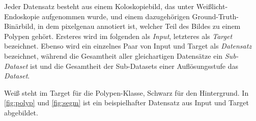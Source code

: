 Jeder Datensatz besteht aus einem Koloskopiebild, das unter Weißlicht-Endoskopie aufgenommen wurde, und einem dazugehörigen Ground-Truth-Binärbild, in dem pixelgenau annotiert ist, welcher Teil des Bildes zu einem Polypen gehört.
Ersteres wird im folgenden als \emph{Input}, letzteres als \emph{Target} bezeichnet.
Ebenso wird ein einzelnes Paar von Input und Target als \emph{Datensatz} bezeichnet, während die Gesamtheit aller gleichartigen Datensätze ein \emph{Sub-Dataset} ist und die Gesamtheit der Sub-Datasets einer Auflösungsstufe das \emph{Dataset}.

Weiß steht im Target für die Polypen-Klasse, Schwarz für den Hintergrund.
In \autoref{fig:polyp} und \autoref{fig:segm} ist ein beispielhafter Datensatz aus Input und Target abgebildet.
